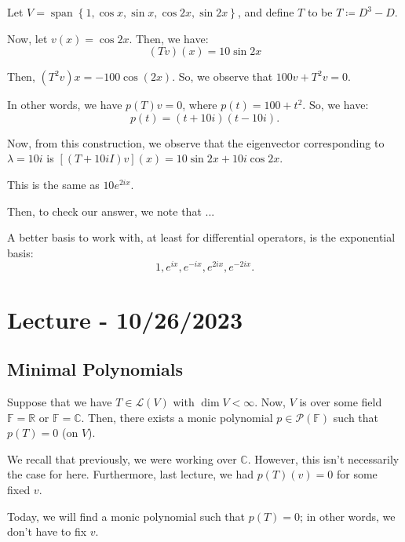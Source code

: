 \documentclass[openany]{book}
\newcommand{\CC}{\mathbb{C}}
\newcommand{\RR}{\mathbb{R}}
\DeclareMathOperator*{\vspan}{span}
\begin{document}
\begin{example}
	Let $V = \vspan\left\{  1, \cos x, \sin x, \cos 2x, \sin 2x \right\}$, and define $T$ to be $T \coloneq D^{3} - D$.
	
	Now, let $v(x) = \cos 2x$. Then, we have:
	\begin{equation*}
		(Tv)(x) = 10\sin 2x
	\end{equation*}

	Then, $(T^{2}v)x = -100\cos(2x)$. So, we observe that $100v + T^{2}v = 0$.
	
	In other words, we have $p(T)v = 0$, where $p(t) = 100 + t^{2}$. So, we have:
	\begin{equation*}
		p(t) = (t+10i)(t-10i).
	\end{equation*}

	Now, from this construction, we observe that the eigenvector corresponding to $\lambda = 10i$ is $[(T+10i I)v](x) = 10\sin 2x + 10i\cos 2x$.
	
	This is the same as $10e^{2ix}$.
	
	Then, to check our answer, we note that ...
\end{example}
\begin{rmk}
	A better basis to work with, at least for differential operators, is the exponential basis:
	\begin{equation*}
		1, e^{ix}, e^{-ix}, e^{2ix}, e^{-2ix}.
	\end{equation*}
\end{rmk}

\section{Lecture - 10/26/2023}
\subsection{Minimal Polynomials}
\begin{thm}
	Suppose that we have $T \in \mathcal L (V)$ with $\dim V < \infty$. Now, $V$ is over some field $\mathbb{F} = \RR$ or $\mathbb{F} = \CC$. Then, there exists a monic polynomial $p \in \mathscr P(\mathbb{F})$ such that $p(T) = 0$ (on $V$).
\end{thm}

We recall that previously, we were working over $\CC$. However, this isn't necessarily the case for here. Furthermore, last lecture, we had $p(T)(v) = 0$ for some fixed $v$. 

Today, we will find a monic polynomial such that $p(T) = 0$; in other words, we don't have to fix $v$.
\end{document}
